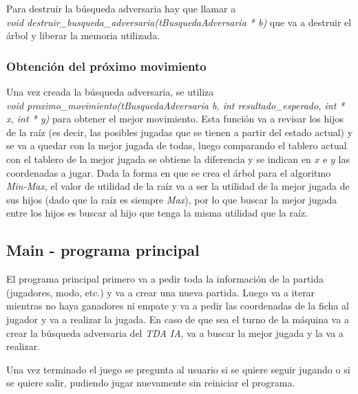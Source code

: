 \documentclass[12pt,a4paper]{article}
\begin{document}
Para destruir la b\'usqueda adversaria hay que llamar a \\\emph{void destruir\_busqueda\_adversaria(tBusquedaAdversaria * b)} que va a destruir el \'arbol y liberar la memoria utilizada.

\subsubsection{Obtenci\'on del pr\'oximo movimiento}
Una vez creada la b\'usqueda adversaria, se utiliza \\\emph{void proximo\_movimiento(tBusquedaAdversaria b, int resultado\_esperado, int * x, int * y)} para obtener el mejor movimiento. Esta funci\'on va a revisar los hijos de la ra\'iz (es decir, las posibles jugadas que se tienen a partir del estado actual) y se va a quedar con la mejor jugada de todas, luego comparando el tablero actual con el tablero de la mejor jugada se obtiene la diferencia y se indican en $x$ e $y$ las coordenadas a jugar. Dada la forma en que se crea el \'arbol para el algoritmo \emph{Min-Max}, el valor de utilidad de la ra\'iz va a ser la utilidad de la mejor jugada de sus hijos (dado que la ra\'iz es siempre \emph{Max}), por lo que buscar la mejor jugada entre los hijos es buscar al hijo que tenga la misma utilidad que la ra\'iz.

\subsection{Main - programa principal}
El programa principal primero va a pedir toda la informaci\'on de la partida (jugadores, modo, etc.) y va a crear una nueva partida. Luego va a iterar mientras no haya ganadores ni empate y va a pedir las coordenadas de la ficha al jugador y va a realizar la jugada. En caso de que sea el turno de la m\'aquina va a crear la b\'usqueda adversaria del \emph{TDA IA}, va a buscar la mejor jugada y la va a realizar.

Una vez terminado el juego se pregunta al usuario si se quiere seguir jugando o si se quiere salir, pudiendo jugar nuevamente sin reiniciar el programa.
\end{document}
